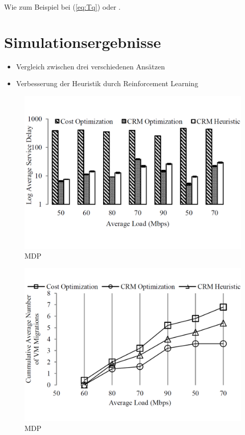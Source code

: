 \documentclass[conference]{IEEEtran}
\begin{document}
 
Wie zum Beispiel bei (\ref{eq:Tq}) oder \cite{IEEEhowto:sum}.


\section{Simulationsergebnisse}
\begin{itemize}
\item Vergleich zwischen drei verschiedenen Ansätzen
\item Verbesserung der Heuristik durch Reinforcement Learning
\end{itemize}


\begin{figure}[h!]
	\centering
	\includegraphics[trim=0 3cm 0 1cm,scale=0.25]{grafik/delay.pdf}
	\caption{MDP}
	\label{img:delay}
\end{figure}

\begin{figure}[h!]
	\centering
	\includegraphics[trim=0 3cm 0 1cm,scale=0.25]{grafik/VMMIG.pdf}
	\caption{MDP}
	\label{img:VMMIG}
\end{figure}
\end{document}
